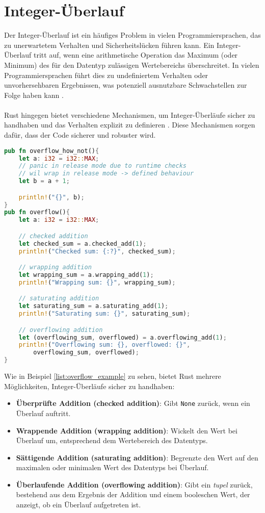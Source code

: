 \chapter{Integer-Überlauf}

Der Integer-Überlauf ist ein häufiges Problem in vielen Programmiersprachen, das zu unerwartetem Verhalten und Sicherheitslücken führen kann. 
Ein Integer-Überlauf tritt auf, wenn eine arithmetische Operation das Maximum (oder Minimum) des für den Datentyp zulässigen Wertebereichs überschreitet. 
In vielen Programmiersprachen führt dies zu undefiniertem Verhalten oder unvorhersehbaren Ergebnissen, was potenziell ausnutzbare Schwachstellen zur Folge haben kann \cite{cwe190}.\\
\\
Rust hingegen bietet verschiedene Mechanismen, um Integer-Überläufe sicher zu handhaben und das Verhalten explizit zu definieren \cite[Kapitel 3.2]{rust2023}. 
Diese Mechanismen sorgen dafür, dass der Code sicherer und robuster wird.

\begin{lstlisting}[language=Rust, caption= Integer-Überläufe, label=list:overflow_example]
pub fn overflow_how_not(){
    let a: i32 = i32::MAX;
    // panic in release mode due to runtime checks
    // wil wrap in release mode -> defined behaviour
    let b = a + 1;  

    println!("{}", b);
}
pub fn overflow(){
    let a: i32 = i32::MAX;

    // checked addition 
    let checked_sum = a.checked_add(1);
    println!("Checked sum: {:?}", checked_sum);  

    // wrapping addition 
    let wrapping_sum = a.wrapping_add(1);
    println!("Wrapping sum: {}", wrapping_sum);  

    // saturating addition 
    let saturating_sum = a.saturating_add(1);
    println!("Saturating sum: {}", saturating_sum);  

    // overflowing addition 
    let (overflowing_sum, overflowed) = a.overflowing_add(1);
    println!("Overflowing sum: {}, overflowed: {}",
        overflowing_sum, overflowed);  
}
\end{lstlisting}
\cleardoublepage
\noindent
Wie in Beispiel \ref{list:overflow_example} zu sehen, bietet Rust mehrere Möglichkeiten, Integer-Überläufe sicher zu handhaben:

\begin{itemize}
    \item \textbf{Überprüfte Addition (checked addition)}: Gibt \texttt{None} zurück, wenn ein Überlauf auftritt.
    \item \textbf{Wrappende Addition (wrapping addition)}: Wickelt den Wert bei Überlauf um, entsprechend dem Wertebereich des Datentyps.
    \item \textbf{Sättigende Addition (saturating addition)}: Begrenzte den Wert auf den maximalen oder minimalen Wert des Datentyps bei Überlauf.
    \item \textbf{Überlaufende Addition (overflowing addition)}: Gibt ein \textit{\gls{tupel}} zurück, bestehend aus dem Ergebnis der Addition und einem booleschen Wert, der anzeigt, ob ein Überlauf aufgetreten ist.
\end{itemize}
